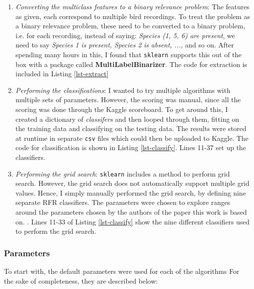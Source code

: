 \documentclass[11pt]{article}
\begin{document}
\begin{enumerate}
\item \textit{Converting the multiclass features to a binary relevance problem}: The features as given, each correspond to multiple bird recordings. To treat the problem as a binary relevance problem, these need to be converted to a binary problem, i.e. for each recording, instead of saying: \textit{Species (1, 5, 6) are present}, we need to say \textit{Species 1 is present, Species 2 is absent, ...,} and so on. After spending many hours in this, I found that \texttt{sklearn} supports this out of the box with a package called \textbf{MultiLabelBinarizer}. The code for extraction is included in Listing \ref{lst-extract}

\item \textit{Performing the classifications}: I wanted to try multiple algorithms with multiple sets of parameters. However, the scoring was manual, since all the scoring was done through the Kaggle scoreboard. To get around this, I created a dictionary of \textit{classifers} and then looped through them, fitting on the training data and classifying on the testing data. The results were stored at runtime in separate \texttt{csv} files which could then be uploaded to Kaggle. The code for classification is shown in Listing \ref{lst-classify}. Lines 11-37 set up the classifiers.

\item \textit{Performing the grid search}: \texttt{sklearn} includes a method to perform grid search. However, the grid search does not automatically support multiple grid values. Hence, I simply manually performed the grid search, by defining nine separate RFR classifiers. The parameters were chosen to explore ranges around the parameters chosen by the authors of the paper this work is based on. \cite{briggs-2012}. Lines 11-33 of Listing \ref{lst-classify} show the nine different classifiers used to perform the grid search.

\end{enumerate}


\subsubsection{Parameters}

To start with, the default parameters were used for each of the algorithms For the sake of completeness, they are described below:
\end{document}
